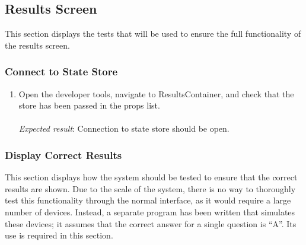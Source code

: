 \subsection{Results Screen} %
\label{sub:results_screen}
This section displays the tests that will be used to ensure the full functionality of the results screen.

\subsubsection{Connect to State Store} %
\label{ssub:connect_to_state_store}
\begin{enumerate}[leftmargin=*]
\item Open the developer tools, navigate to ResultsContainer, and check that the store has been passed in the props list.\\\\
\textit{Expected result}: Connection to state store should be open.
\end{enumerate}

\subsubsection{Display Correct Results} %
\label{ssub:display_correct_results}
This section displays how the system should be tested to ensure that the correct results are shown. Due to the scale of the system, there is no way to thoroughly test this functionality through the normal interface, as it would require a large number of devices. Instead, a separate program has been written that simulates these devices; it assumes that the correct answer for a single question is ``A''. Its use is required in this section.

